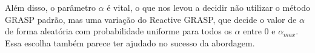 \documentclass[a4paper,10pt]{abnt} %
\begin{document}
Além disso, o parâmetro $\alpha$ é vital, o que nos levou a decidir não utilizar o método GRASP padrão, mas uma variação do Reactive GRASP, que decide o valor de $\alpha$ de forma aleatória com probabilidade uniforme para todos os $\alpha$ entre 0 e $\alpha_{max}$. Essa escolha também parece ter ajudado no sucesso da abordagem.

{}

\end{document}
